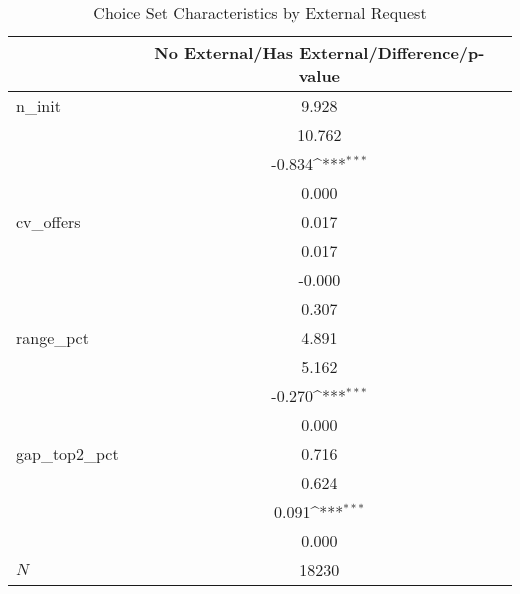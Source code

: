\begin{table}[htbp]\centering
\def\sym#1{\ifmmode^{#1}\else\(^{#1}\)\fi}
\caption{Choice Set Characteristics by External Request}
\begin{tabular}{l*{1}{c}}
\hline\hline
            &No External/Has External/Difference/p-value         \\
\hline
n\_init      &       9.928         \\
            &      10.762         \\
            &      -0.834\sym{***}\\
            &       0.000         \\
cv\_offers   &       0.017         \\
            &       0.017         \\
            &      -0.000         \\
            &       0.307         \\
range\_pct   &       4.891         \\
            &       5.162         \\
            &      -0.270\sym{***}\\
            &       0.000         \\
gap\_top2\_pct&       0.716         \\
            &       0.624         \\
            &       0.091\sym{***}\\
            &       0.000         \\
\hline
\(N\)       &       18230         \\
\hline\hline
\end{tabular}
\end{table}
